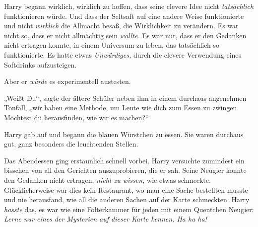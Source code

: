 Harry begann wirklich, wirklich zu hoffen, dass seine clevere Idee nicht \emph{tatsächlich} funktionieren würde. Und dass der Seltsaft auf eine andere Weise funktionierte und nicht \emph{wirklich} die Allmacht besaß, die Wirklichkeit zu verändern. Es war nicht so, dass er nicht allmächtig sein \emph{wollte.} Es war nur, dass er den Gedanken nicht ertragen konnte, in einem Universum zu leben, das tatsächlich so funktionierte. Es hatte etwas \emph{Unwürdiges,} durch die clevere Verwendung eines Softdrinks aufzusteigen.

Aber er \emph{würde} es experimentell austesten.

„Weißt Du“, sagte der ältere Schüler neben ihm in einem durchaus angenehmen Tonfall, „wir haben eine Methode, um Leute wie dich zum Essen zu zwingen. Möchtest du herausfinden, wie wir es machen?“

Harry gab auf und begann die blauen Würstchen zu essen. Sie waren durchaus gut, ganz besonders die leuchtenden Stellen.

Das Abendessen ging erstaunlich schnell vorbei. Harry versuchte zumindest ein bisschen von all den Gerichten auszuprobieren, die er sah. Seine Neugier konnte den Gedanken nicht ertragen, \emph{nicht zu wissen,} wie etwas schmeckte. Glücklicherweise war dies kein Restaurant, wo man eine Sache bestellten musste und nie herausfand, wie all die anderen Sachen auf der Karte schmeckten. Harry \emph{hasste} das, es war wie eine Folterkammer für jeden mit einem Quentchen Neugier: \emph{Lerne nur eines der Mysterien auf dieser Karte kennen. Ha ha ha!}

